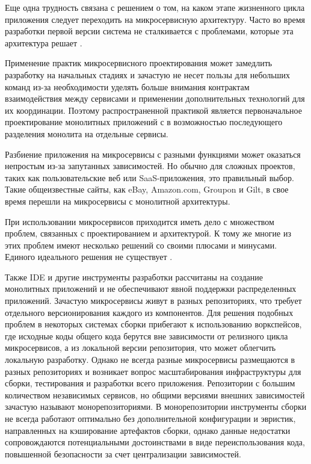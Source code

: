 Еще одна трудность связана с решением о том, на каком этапе жизненного цикла
приложения следует переходить на микросервисную архитектуру. Часто во время
разработки первой версии система не сталкивается с проблемами, которые эта
архитектура решает \cite{kaban}. 

Применение практик микросервисного проектирования может замедлить разработку
на начальных стадиях и зачастую не несет пользы для небольших команд из-за необходимости уделять больше
внимания контрактам взаимодействия между сервисами и применении дополнительных технологий для их координации. 
Поэтому распространенной практикой является первоначальное проектирование монолитных приложений с
в возможностью последующего разделения монолита на отдельные сервисы.

Разбиение приложения на микросервисы с разными функциями может оказаться непростым
из-за запутанных зависимостей. Но обычно для сложных проектов, таких как пользовательские веб или
SaaS-приложения, это правильный выбор. Такие общеизвестные сайты, как eBay, Amazon.com, Groupon и Gilt, в свое время перешли на микросервисы с монолитной архитектуры.

При использовании микросервисов приходится иметь дело с множеством проблем, связанных с проектированием и архитектурой.
К тому же многие из этих
проблем имеют несколько решений со своими плюсами и минусами. Единого
идеального решения не существует \cite{micro-1}.

Также IDE и другие инструменты разработки рассчитаны на создание монолитных
приложений и не обеспечивают явной поддержки распределенных приложений. Зачастую микросервисы живут в разных репозиториях, что
требует отдельного версионирования каждого из компонентов. Для решения подобных проблем в некоторых системах сборки прибегают к использованию
воркспейсов, где исходные коды общего кода берутся вне зависимости от релизного цикла микросервисов, а из локальной версии репозитория,
что может облегчить локальную разработку. Однако не всегда разные микросервисы размещаются в разных репозиториях и возникает вопрос
масштабирования инфраструктуры для сборки, тестирования и разработки всего приложения. Репозитории с большим количеством независимых сервисов, но
общими версиями внешних зависимостей зачастую называют монорепозиториями. В монорепозитории инструменты сборки не всегда работают оптимально
без дополнительной конфигурации и эвристик, направленных на кэширование артефактов сборки, однако данные недостатки сопровождаются потенциальными
достоинствами в виде переиспользования кода, повышенной безопасности за счет централизации зависимостей.

